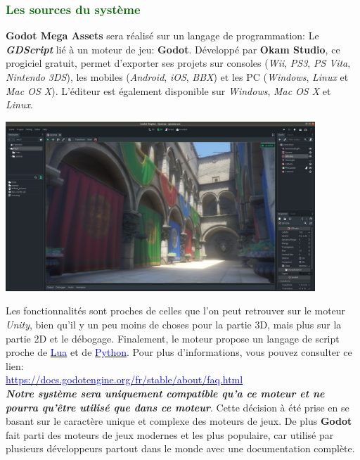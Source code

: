 \documentclass[ebook, 8pt, oneside, openany]{memoir}
\begin{document}
	\subsubsection{\textcolor{darkgreen}{Les sources du système}}
	\textbf{Godot Mega Assets} sera réalisé sur un langage de programmation: Le \textbf{\textit{GDScript}}
	lié à un moteur de jeu: \textbf{Godot}. Développé par \textbf{Okam Studio}, ce progiciel gratuit, permet
	d'exporter ses projets sur consoles (\emph{Wii}, \emph{PS3}, \emph{PS Vita}, \emph{Nintendo 3DS}), les
	mobiles (\emph{Android}, \emph{iOS}, \emph{BBX}) et les PC (\emph{Windows}, \emph{Linux} et \emph{Mac OS
	X}). L'éditeur est également disponible sur \textit{Windows}, \textit{Mac OS X} et \textit{Linux}.\\
	\begin{center}\includegraphics[width = 330pt]{godot_screenshot.jpeg}\end{center}
	Les fonctionnalités sont proches de celles que l'on peut retrouver sur le moteur \textit{Unity}, bien
	qu'il y un peu moins de choses pour la partie 3D, mais plus sur la partie 2D et le débogage. Finalement,
	le moteur propose un langage de script proche de
	\href{https://www.ionos.fr/digitalguide/sites-internet/developpement-web/tutoriel-lua/}{\textcolor{blue}
	{Lua}} et de \href{https://docs.python.org/3/}{\textcolor{blue}{Python}}. Pour plus d'informations, vous
	pouvez consulter ce lien:\\\href{https://docs.godotengine.org/fr/stable/about/faq.html}{\textcolor{blue}
	{https://docs.godotengine.org/fr/stable/about/faq.html}}\\
	\textbf{\textit{Notre système sera uniquement compatible qu'a ce moteur et ne pourra qu'être utilisé que
	dans ce moteur}}. Cette décision à été prise en se basant sur le caractère unique et complexe des
	moteurs de jeux. De plus \textbf{Godot} fait parti des moteurs de jeux modernes et les plus populaire,
	car utilisé par plusieurs développeurs partout dans le monde avec une documentation complète.
\end{document}
